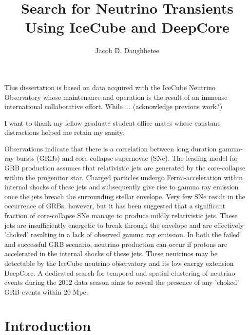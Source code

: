 \documentclass{gatech-thesis}
\title{Search for Neutrino Transients Using IceCube and DeepCore}
\author{Jacob D. Daughhetee}
\begin{document}

\begin{preliminary}
\begin{dedication}
\null\vfil
{\large
\begin{center}

\end{center}}
\vfil\null
\end{dedication}
\begin{preface}
This dissertation is based on data acquired with the IceCube Neutrino Observatory whose maintenance and operation is the result of an immense international collaborative effort. While ... (acknowledge previous work?)
\end{preface}
\begin{acknowledgements}
I want to thank my fellow graduate student office mates whose constant distractions helped me retain my sanity.
\end{acknowledgements}
\contents

\begin{summary}
Observations indicate that there is a correlation between long duration gamma-ray bursts (GRBs) and core-collapse supernovae (SNe).  The leading model for GRB production assumes that relativistic jets are generated by the core-collapse within the progenitor star.  Charged particles undergo Fermi-acceleration within internal shocks of these jets and subsequently give rise to gamma ray emission once the jets breach the surrounding stellar envelope.  Very few SNe result in the occurrence of GRBs, however,  but it has been suggested that a significant fraction of core-collapse SNe manage to produce mildly relativistic jets.  These jets are insufficiently energetic to break through the envelope and are effectively 'choked' resulting in a lack of observed gamma ray emission.  In both the failed and successful GRB scenario, neutrino production can occur if protons are accelerated in the internal shocks of these jets.  These neutrinos may be detectable by the IceCube neutrino observatory and its low energy extension DeepCore.  A dedicated search for temporal and spatial clustering of neutrino events during the 2012 data season aims to reveal the presence of any 'choked' GRB events within 20 Mpc.
\end{summary}

\end{preliminary}
\chapter{Introduction}
\end{document}
